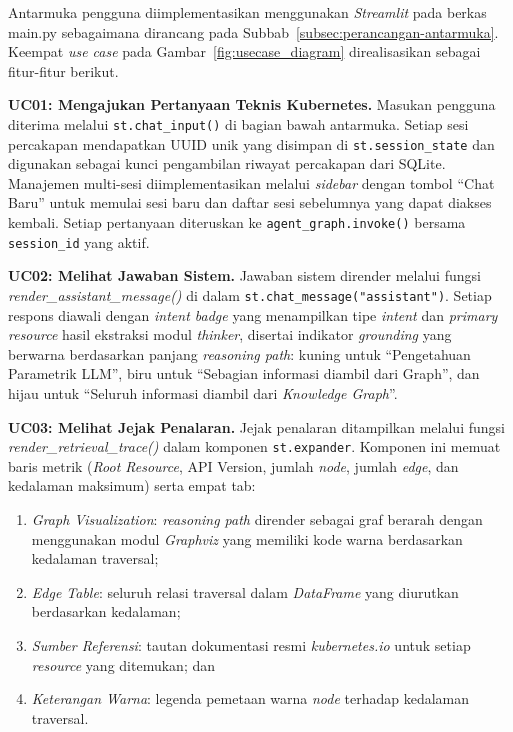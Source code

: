 Antarmuka pengguna diimplementasikan menggunakan \textit{Streamlit} pada berkas main.py sebagaimana dirancang pada Subbab~\ref{subsec:perancangan-antarmuka}. Keempat \textit{use case} pada Gambar~\ref{fig:usecase_diagram} direalisasikan sebagai fitur-fitur berikut.

\textbf{UC01: Mengajukan Pertanyaan Teknis Kubernetes.}
Masukan pengguna diterima melalui \texttt{st.chat\_input()} di bagian bawah antarmuka. Setiap sesi percakapan mendapatkan UUID unik yang disimpan di \texttt{st.session\_state} dan digunakan sebagai kunci pengambilan riwayat percakapan dari SQLite. Manajemen multi-sesi diimplementasikan melalui \textit{sidebar} dengan tombol ``Chat Baru'' untuk memulai sesi baru dan daftar sesi sebelumnya yang dapat diakses kembali. Setiap pertanyaan diteruskan ke \texttt{agent\_graph.invoke()} bersama \texttt{session\_id} yang aktif.

\textbf{UC02: Melihat Jawaban Sistem.}
Jawaban sistem dirender melalui fungsi \textit{render\_assistant\_message()} di dalam \texttt{st.chat\_message("assistant")}. Setiap respons diawali dengan \textit{intent badge} yang menampilkan tipe \textit{intent} dan \textit{primary resource} hasil ekstraksi modul \textit{thinker}, disertai indikator \textit{grounding} yang berwarna berdasarkan panjang \textit{reasoning path}: kuning untuk ``Pengetahuan Parametrik LLM'', biru untuk ``Sebagian informasi diambil dari Graph'', dan hijau untuk ``Seluruh informasi diambil dari \textit{Knowledge Graph}''.

\textbf{UC03: Melihat Jejak Penalaran.}
Jejak penalaran ditampilkan melalui fungsi \textit{render\_retrieval\_trace()} dalam komponen \texttt{st.expander}. Komponen ini memuat baris metrik (\textit{Root Resource}, API Version, jumlah \textit{node}, jumlah \textit{edge}, dan kedalaman maksimum) serta empat tab:
\begin{enumerate}
    \item \textit{Graph Visualization}: \textit{reasoning path} dirender sebagai graf berarah dengan menggunakan modul \textit{Graphviz} yang memiliki kode warna berdasarkan kedalaman traversal;
    \item \textit{Edge Table}: seluruh relasi traversal dalam \textit{DataFrame} yang diurutkan berdasarkan kedalaman;
    \item \textit{Sumber Referensi}: tautan dokumentasi resmi \textit{kubernetes.io} untuk setiap \textit{resource} yang ditemukan; dan
    \item \textit{Keterangan Warna}: legenda pemetaan warna \textit{node} terhadap kedalaman traversal.
\end{enumerate}

